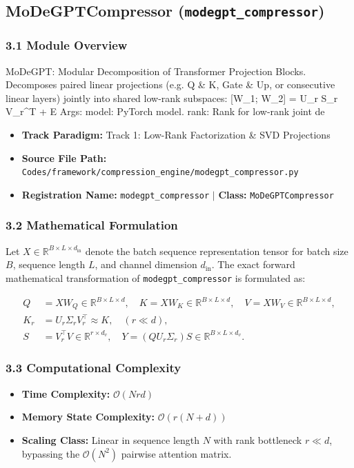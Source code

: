 \subsection{MoDeGPTCompressor (\texttt{modegpt\_compressor})}
\label{sec:app_module_modegpt\_compressor}

\subsubsection*{3.1 Module Overview}
MoDeGPT: Modular Decomposition of Transformer Projection Blocks. Decomposes paired linear projections (e.g. Q \& K, Gate \& Up, or consecutive linear layers) jointly into shared low-rank subspaces:     [W\_1; W\_2] = U\_r S\_r V\_r^T + E  Args:     model: PyTorch model.     rank: Rank for low-rank joint de
\begin{itemize}
    \item \textbf{Track Paradigm:} Track 1: Low-Rank Factorization & SVD Projections
    \item \textbf{Source File Path:} \texttt{Codes/framework/compression\_engine/modegpt\_compressor.py}
    \item \textbf{Registration Name:} \texttt{modegpt\_compressor} $\mid$ \textbf{Class:} \texttt{MoDeGPTCompressor}
\end{itemize}

\subsubsection*{3.2 Mathematical Formulation}
Let $X \in \mathbb{R}^{B \times L \times d_{\text{in}}}$ denote the batch sequence representation tensor for batch size $B$, sequence length $L$, and channel dimension $d_{\text{in}}$. The exact forward mathematical transformation of \texttt{modegpt\_compressor} is formulated as:

\begin{align}
Q &= X W_Q \in \mathbb{R}^{B \times L \times d}, \quad K = X W_K \in \mathbb{R}^{B \times L \times d}, \quad V = X W_V \in \mathbb{R}^{B \times L \times d}, \\
K_r &= U_r \Sigma_r V_r^\top \approx K, \quad (r \ll d), \\
S &= V_r^\top V \in \mathbb{R}^{r \times d_v}, \quad Y = (Q U_r \Sigma_r) S \in \mathbb{R}^{B \times L \times d_v}.
\end{align}


\subsubsection*{3.3 Computational Complexity}
\begin{itemize}
    \item \textbf{Time Complexity:} $\mathcal{O}(N r d)$
    \item \textbf{Memory State Complexity:} $\mathcal{O}(r(N + d))$
    \item \textbf{Scaling Class:} Linear in sequence length $N$ with rank bottleneck $r \ll d$, bypassing the $\mathcal{O}(N^2)$ pairwise attention matrix.
\end{itemize}

